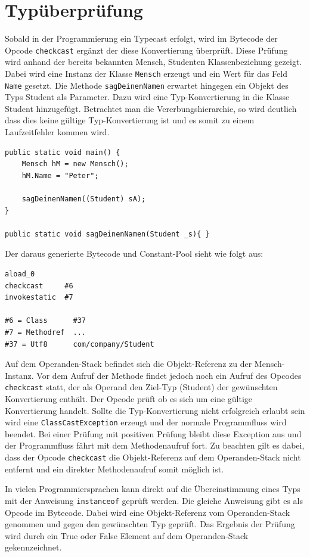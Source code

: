 \documentclass[conference]{IEEEtran}
\begin{document}
\section{Typüberprüfung}
Sobald in der Programmierung ein Typecast erfolgt, wird im Bytecode der Opcode \verb|checkcast| ergänzt der diese Konvertierung überprüft. Diese Prüfung wird anhand der bereits bekannten Mensch, Studenten Klassenbeziehung gezeigt. Dabei wird eine Instanz der Klasse \verb|Mensch| erzeugt und ein Wert für das Feld \verb|Name| gesetzt. Die Methode \verb|sagDeinenNamen| erwartet hingegen ein Objekt des Typs Student als Parameter. Dazu wird eine Typ-Konvertierung in die Klasse Student hinzugefügt. Betrachtet man die Vererbungshierarchie, so wird deutlich dass dies keine gültige Typ-Konvertierung ist und es somit zu einem Laufzeitfehler kommen wird.
\begin{lstlisting}
public static void main() {
	Mensch hM = new Mensch();
	hM.Name = "Peter";

	sagDeinenNamen((Student) sA);
}

public static void sagDeinenNamen(Student _s){ }
\end{lstlisting}
Der daraus generierte Bytecode und Constant-Pool sieht wie folgt aus:
\begin{lstlisting}
aload_0
checkcast     #6
invokestatic  #7

#6 = Class      #37
#7 = Methodref  ...
#37 = Utf8      com/company/Student
\end{lstlisting}
Auf dem Operanden-Stack befindet sich die Objekt-Referenz zu der Mensch-Instanz. Vor dem Aufruf der Methode findet jedoch noch ein Aufruf des Opcodes \verb|checkcast| statt, der als Operand den Ziel-Typ (Student) der gewünschten Konvertierung enthält. Der Opcode prüft ob es sich um eine gültige Konvertierung handelt. Sollte die Typ-Konvertierung nicht erfolgreich erlaubt sein wird eine \verb|ClassCastException| erzeugt und der normale Programmfluss wird beendet. Bei einer Prüfung mit positiven Prüfung bleibt diese Exception aus und der Programmfluss fährt mit dem Methodenaufruf fort. Zu beachten gilt es dabei, dass der Opcode \verb|checkcast| die Objekt-Referenz auf dem Operanden-Stack nicht entfernt und ein direkter Methodenaufruf somit möglich ist.\cite{Venners.1996}

In vielen Programmiersprachen kann direkt auf die Übereinstimmung eines Typs mit der Anweisung \verb|instanceof| geprüft werden. Die gleiche Anweisung gibt es als Opcode im Bytecode. Dabei wird eine Objekt-Referenz vom Operanden-Stack genommen und gegen den gewünschten Typ geprüft. Das Ergebnis der Prüfung wird durch ein True oder False Element auf dem Operanden-Stack gekennzeichnet. \cite{Venners.1996}


 
\end{document}

